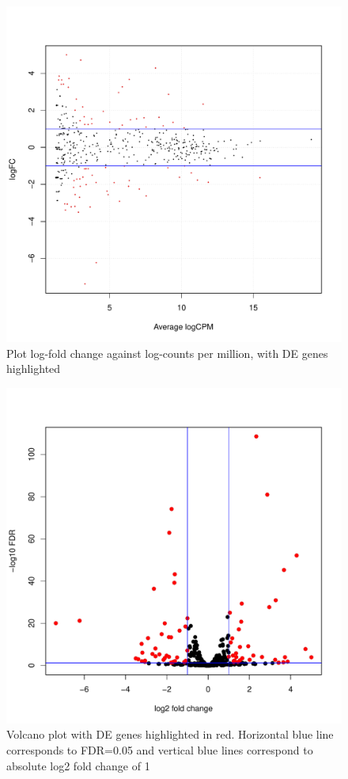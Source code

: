 \documentclass[12pt]{article}
\begin{document}
\begin{figure}[H]
\begin{center}
\includegraphics{9999_report-fig5}
\end{center}
\caption{Plot log-fold change against log-counts per million, with DE genes highlighted}
\end{figure} 

\begin{figure}[H]
\begin{center}
\includegraphics{9999_report-fig6}
\end{center}
\caption{Volcano plot with DE genes highlighted in red. Horizontal blue line corresponds to FDR=0.05 and vertical blue lines correspond to absolute log2 fold change of 1}
\end{figure} 
\end{document}
